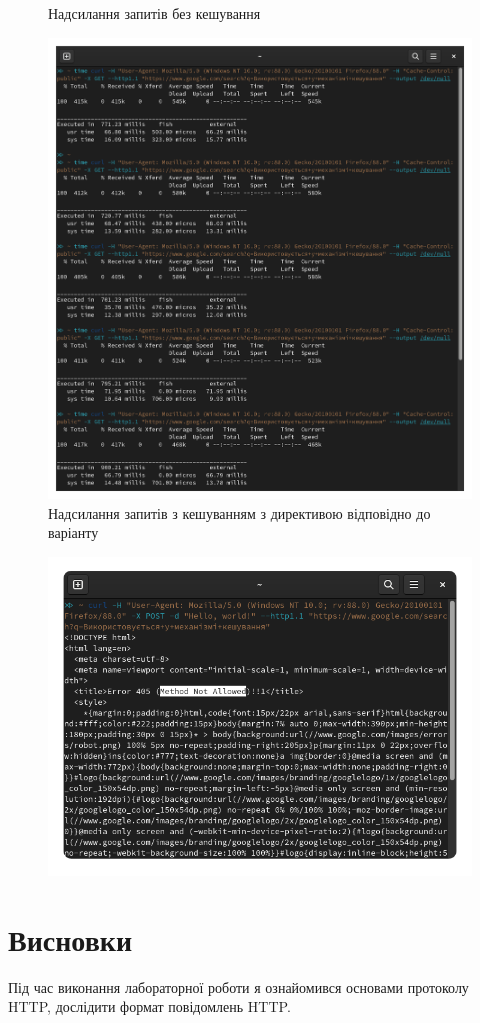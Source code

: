 \documentclass{article}
\begin{document}
\begin{normalsize}
\begin{figure}[H]
	\caption{Надсилання запитів без кешування}
\end{figure}
\begin{figure}[H]
	\centering
	\includegraphics[width=\textwidth]{45}
	\caption{Надсилання запитів з кешуванням з директивою відповідно до варіанту}
\end{figure}
\begin{figure}[H]
	\centering
	\includegraphics[width=\textwidth]{46}
\end{figure}

\section*{Висновки}
Під час виконання лабораторної роботи я ознайомився основами протоколу HTTP, дослідити формат
повідомлень HTTP.
	    
\end{normalsize}
\end{document}
